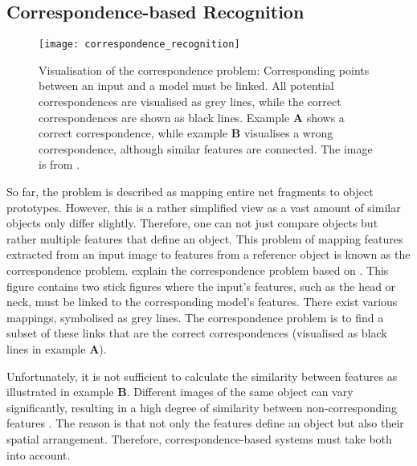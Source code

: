 \subsection{Correspondence-based Recognition}
\begin{figure}[h]
    \centering
    \texttt{[image: correspondence\_recognition]}
    \caption[The visual correspondence problem]{Visualisation of the correspondence problem: Corresponding points between an input and a model must be linked. All potential correspondences are visualised as grey lines, while the correct correspondences are shown as black lines. Example $\boldsymbol{A}$ shows a correct correspondence, while example $\boldsymbol{B}$ visualises a wrong correspondence, although similar features are connected. The image is from \cite{wolfrum_recurrent_2008}.}
\end{figure}

So far, the problem is described as mapping entire net fragments to object prototypes.
However, this is a rather simplified view as a vast amount of similar objects only differ slightly.
Therefore, one can not just compare objects but rather multiple features that define an object.
This problem of mapping features extracted from an input image to features from a reference object is known as the correspondence problem.
 explain the correspondence problem based on . This figure contains two stick figures where the input's features, such as the head or neck, must be linked to the corresponding model's features.
There exist various mappings, symbolised as grey lines.
The correspondence problem is to find a subset of these links that are the correct correspondences (visualised as black lines in example $\boldsymbol{A}$). 

Unfortunately, it is not sufficient to calculate the similarity between features as illustrated in 
 example $\boldsymbol{B}$. Different images of the same object can vary significantly, resulting in a high degree of similarity between non-corresponding features . The reason is that not only the features define an object but also their spatial arrangement. Therefore, correspondence-based systems must take both into account.

